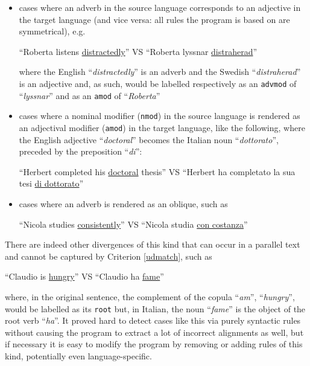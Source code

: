\begin{itemize}
 \item cases where an adverb in the source language corresponds to an adjective in the target language (and vice versa: all rules the program is based on are symmetrical), e.g.
 \begin{example}
 ``Roberta listens \underline{distractedly}'' VS ``Roberta lyssnar \underline{distraherad}''
 \end{example}
 where the English ``\textit{distractedly}'' is an adverb and the Swedish ``\textit{distraherad}'' is an adjective and, as such, would be labelled respectively as an \texttt{advmod} of ``\textit{lyssnar}'' and as an \texttt{amod} of ``\textit{Roberta}''
 \item cases where a nominal modifier (\texttt{nmod}) in the source language is rendered as an adjectival modifier (\texttt{amod}) in the target language, like the following, where the English adjective ``\textit{doctoral}'' becomes the Italian noun ``\textit{dottorato}'', preceded by the preposition ``\textit{di}'':
 \begin{example} \label{herb}
 ``Herbert completed his \underline{doctoral} thesis'' VS ``Herbert ha completato la sua tesi \underline{di dottorato}''
 \end{example}
 \item cases where an adverb is rendered as an oblique, such as
 \begin{example}
 ``Nicola studies \underline{consistently}'' VS ``Nicola studia \underline{con costanza}''
 \end{example}
\end{itemize} \smallbreak

There are indeed other divergences of this kind that can occur in a parallel text and cannot be captured by Criterion \ref{udmatch}, such as
\begin{example}
 ``Claudio is \underline{hungry}'' VS ``Claudio ha \underline{fame}''
\end{example}
where, in the original sentence, the complement of the copula ``\textit{am}'', ``\textit{hungry}'', would be labelled as its \texttt{root} but, in Italian, the noun ``\textit{fame}'' is the object of the root verb ``\textit{ha}''. 
It proved hard to detect cases like this via purely syntactic rules without causing the program to extract a lot of incorrect alignments as well, but if necessary it is easy to modify the program by removing or adding rules of this kind, potentially even language-specific.

